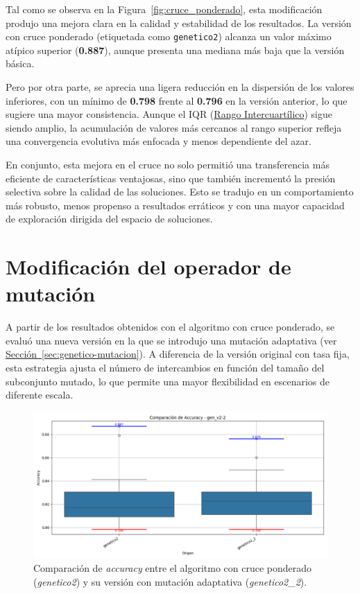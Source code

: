 Tal como se observa en la Figura~\ref{fig:cruce_ponderado}, esta modificación produjo una mejora clara en la calidad y estabilidad de los resultados.
La versión con cruce ponderado (etiquetada como \texttt{genetico2}) alcanza un valor máximo atípico superior (\textbf{0.887}),
aunque presenta una mediana más baja que la versión básica.

Pero por otra parte, se aprecia una ligera reducción en la dispersión de los valores inferiores,
con un mínimo de \textbf{0.798} frente al \textbf{0.796} en la versión anterior, lo que sugiere una mayor consistencia.
Aunque el IQR (\hyperref[subsec:visualizacion-de-resultados]{Rango Intercuartílico}) sigue siendo amplio,
la acumulación de valores más cercanos al rango superior refleja una convergencia evolutiva más enfocada y menos dependiente del azar.

En conjunto, esta mejora en el cruce no solo permitió una transferencia más eficiente de características ventajosas,
sino que también incrementó la presión selectiva sobre la calidad de las soluciones.
Esto se tradujo en un comportamiento más robusto, menos propenso a resultados erráticos y con una mayor capacidad de exploración dirigida del espacio de soluciones.


\section{Modificación del operador de mutación}\label{sec:modificacion-mutacion}
A partir de los resultados obtenidos con el algoritmo con cruce ponderado, se evaluó una nueva versión en la que se introdujo una mutación adaptativa
(ver \hyperref[sec:genetico-mutacion]{Sección~\ref*{sec:genetico-mutacion}}).
A diferencia de la versión original con tasa fija, esta estrategia ajusta el número de intercambios en función del tamaño del subconjunto mutado,
lo que permite una mayor flexibilidad en escenarios de diferente escala.

\begin{figure}[htp]
    \centering
    \includegraphics[width=1\textwidth]{imagenes/evaluaciones/mutacion-adaptativa}
    \caption{Comparación de \textit{accuracy} entre el algoritmo con cruce ponderado (\textit{genetico2}) y su versión con mutación adaptativa (\textit{genetico2\_2}).}
    \label{fig:mutacion-adaptativa}
\end{figure}

